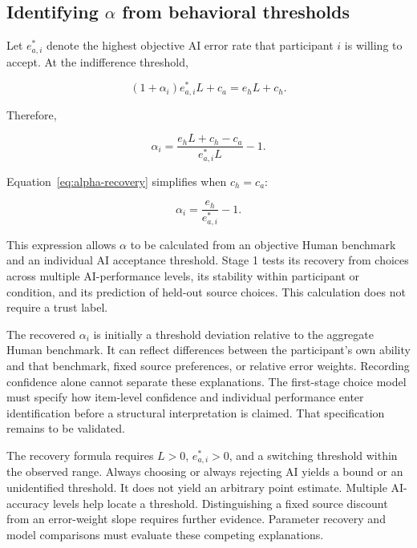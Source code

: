 \documentclass[11pt,a4paper]{article}
\begin{document}
\subsection{\texorpdfstring{Identifying $\alpha$ from behavioral thresholds}{Identifying alpha from behavioral thresholds}}

Let $e_{a,i}^{*}$ denote the highest objective AI error rate that participant $i$ is willing to accept. At the indifference threshold,

\begin{equation*}
(1+\alpha_i)e_{a,i}^{*}L+c_a=e_hL+c_h.
\end{equation*}

Therefore,

\begin{equation}
\alpha_i=\frac{e_hL+c_h-c_a}{e_{a,i}^{*}L}-1.
\label{eq:alpha-recovery}
\end{equation}

Equation~\ref{eq:alpha-recovery} simplifies when $c_h=c_a$:

\begin{equation*}
\alpha_i=\frac{e_h}{e_{a,i}^{*}}-1.
\end{equation*}

This expression allows $\alpha$ to be calculated from an objective Human benchmark and an individual AI acceptance threshold. Stage 1 tests its recovery from choices across multiple AI-performance levels, its stability within participant or condition, and its prediction of held-out source choices. This calculation does not require a trust label.

The recovered $\alpha_i$ is initially a threshold deviation relative to the aggregate Human benchmark. It can reflect differences between the participant's own ability and that benchmark, fixed source preferences, or relative error weights. Recording confidence alone cannot separate these explanations. The first-stage choice model must specify how item-level confidence and individual performance enter identification before a structural interpretation is claimed. That specification remains to be validated.

The recovery formula requires $L>0$, $e_{a,i}^{*}>0$, and a switching threshold within the observed range. Always choosing or always rejecting AI yields a bound or an unidentified threshold. It does not yield an arbitrary point estimate. Multiple AI-accuracy levels help locate a threshold. Distinguishing a fixed source discount from an error-weight slope requires further evidence. Parameter recovery and model comparisons must evaluate these competing explanations.
\end{document}
